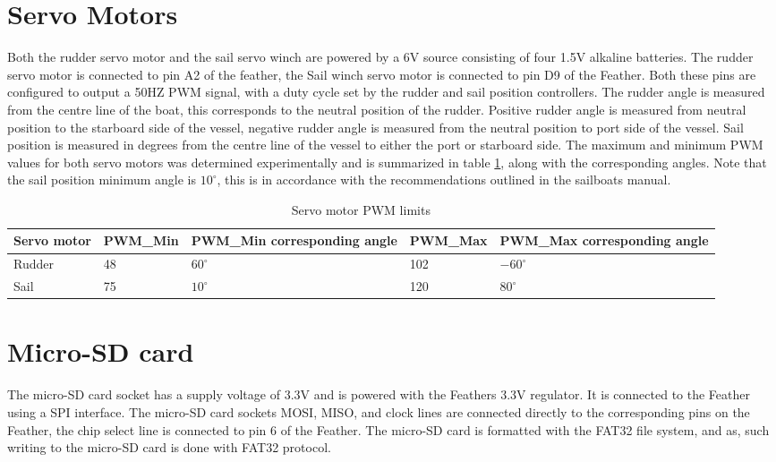 \section{Servo Motors}
Both the rudder servo motor and the sail servo winch are powered by a 6V source consisting of four 1.5V alkaline batteries. The rudder servo motor is connected to pin
A2 of the feather, the Sail winch servo motor is connected to pin D9 of the Feather. Both these pins are configured to output a 50HZ PWM signal, with a duty cycle set
by the rudder and sail position controllers. The rudder angle is measured from the centre line of the boat, this corresponds to the neutral position of the rudder. Positive 
rudder angle is measured from neutral position to the starboard side of the vessel, negative rudder angle is measured from the neutral position to port side of the vessel. 
Sail position is measured in degrees from the centre line of the vessel to either the port or starboard side. The maximum and minimum PWM values for both servo motors was 
determined experimentally and is summarized in table \ref{table:pwm}, along with the corresponding angles. Note that the sail position minimum angle is $10^{\circ}$, this 
is in accordance with the recommendations outlined in the sailboats manual.

\begin{table}[!h]
    \centering
    \caption{Servo motor PWM limits}
    \label{table:pwm}
    \begin{tabularx}{\columnwidth}{ | X | X | X | X | X | }
        
        \hline
        Servo motor & PWM\_Min & PWM\_Min corresponding angle & PWM\_Max & PWM\_Max corresponding angle \\
        \hline
        Rudder & 48 & $60^{\circ}$ & 102 & $-60^{\circ}$ \\
        \hline
        Sail & 75 &  $10^{\circ}$ & 120 & $80^{\circ}$ \\
        \hline
    \end{tabularx}
\end{table}

\section{Micro-SD card}
The micro-SD card socket has a supply voltage of 3.3V and is powered with the Feathers 3.3V regulator. It is connected to the Feather using a SPI interface. The micro-SD card sockets MOSI, MISO,
 and clock lines are connected directly to the corresponding pins on the Feather, the chip select line is connected to pin 6 of the Feather. The micro-SD card is formatted with the FAT32 file 
 system, and as, such writing to the micro-SD card is done with FAT32 protocol.


